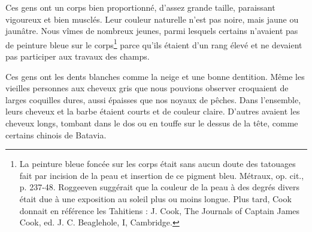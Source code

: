 \documentclass{article}
\begin{document}
        
    Ces gens ont un corps bien proportionné, d'assez grande taille, paraissant vigoureux et bien musclés. Leur couleur naturelle n'est pas noire, mais jaune ou jaunâtre. Nous vîmes de nombreux jeunes, parmi lesquels certains n'avaient pas de peinture bleue sur le corps\footnote{La peinture bleue foncée sur les corps était sans aucun doute des tatouages fait par incision de la peau et insertion de ce pigment bleu. Métraux, op. cit., p. 237-48. Roggeeven suggérait que la couleur de la peau à des degrés divers était due à une exposition au soleil plus ou moins longue. Plus tard, Cook donnait en référence les Tahitiens : J. Cook, The Journals of Captain James Cook, ed. J. C. Beaglehole, I, Cambridge.} parce qu'ils étaient d'un rang élevé et ne devaient pas participer aux travaux des champs.
            
        
    Ces gens ont les dents blanches comme la neige et une bonne dentition. Même les vieilles personnes aux cheveux gris que nous pouvions observer croquaient de larges coquilles dures, aussi épaisses que nos noyaux de pêches. Dans l'ensemble, leurs cheveux et la barbe étaient courts et de couleur claire. D'autres avaient les cheveux longs, tombant dans le dos ou en touffe sur le dessus de la tête, comme certains chinois de Batavia. 
            
\end{document}
